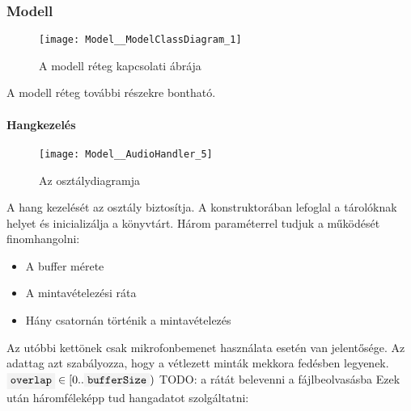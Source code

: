 \subsubsection{Modell}
\begin{figure}[h]
	\texttt{[image: Model\_\_ModelClassDiagram\_1]}
	\centering
	\caption{A modell r\'eteg kapcsolati \'abr\'aja}
\end{figure}
A modell r\'eteg tov\'abbi r\'eszekre bonthat\'o.

\paragraph{Hangkezel\'es}
\begin{figure}[h]
	\texttt{[image: Model\_\_AudioHandler\_5]}
	\centering
	\caption{Az  oszt\'alydiagramja}
\end{figure}
A hang kezel\'es\'et az  oszt\'aly biztos\'itja.
A konstruktor\'aban lefoglal a t\'arol\'oknak helyet \'es inicializ\'alja a  k\"onyvt\'art.
H\'arom param\'eterrel tudjuk a m\H uk\"od\'es\'et finomhangolni:
\begin{itemize}
	\item A buffer m\'erete
	\item A mintav\'etelez\'esi r\'ata
	\item H\'any csatorn\'an t\"ort\'enik a mintav\'etelez\'es
\end{itemize}
Az ut\'obbi kett\"onek csak mikrofonbemenet haszn\'alata eset\'en van jelent\H os\'ege.
Az  adattag azt szab\'alyozza, hogy a v\'etlezett mint\'ak mekkora fed\'esben legyenek. $\code{overlap}\in[0..\code{bufferSize})$
TODO: a r\'at\'at belevenni a f\'ajlbeolvas\'asba
\newline
Ezek ut\'an h\'aromf\'elek\'epp tud hangadatot szolg\'altatni:
